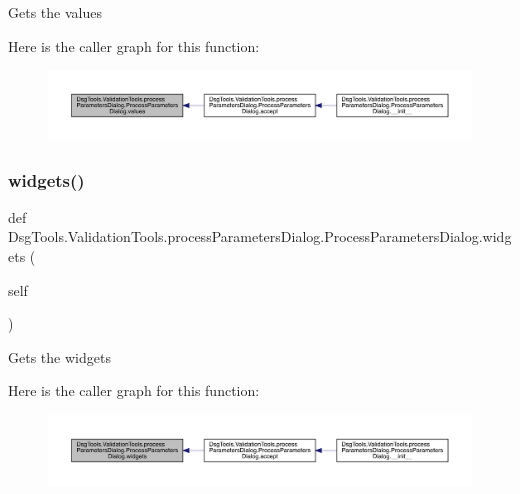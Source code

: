\begin{DoxyVerb}Gets the values
\end{DoxyVerb}
 Here is the caller graph for this function\+:
\nopagebreak
\begin{figure}[H]
\begin{center}
\leavevmode
\includegraphics[width=350pt]{class_dsg_tools_1_1_validation_tools_1_1process_parameters_dialog_1_1_process_parameters_dialog_ac16e1fb8ce02551da4ccb5bcc632f63b_icgraph}
\end{center}
\end{figure}
\mbox{\label{class_dsg_tools_1_1_validation_tools_1_1process_parameters_dialog_1_1_process_parameters_dialog_a6c52b36fdddcbcc1d35597bd5bfc0ff3}} 
\subsubsection{\texorpdfstring{widgets()}{widgets()}}
{\footnotesize\ttfamily def Dsg\+Tools.\+Validation\+Tools.\+process\+Parameters\+Dialog.\+Process\+Parameters\+Dialog.\+widgets (\begin{DoxyParamCaption}\item[{}]{self }\end{DoxyParamCaption})}

\begin{DoxyVerb}Gets the widgets
\end{DoxyVerb}
 Here is the caller graph for this function\+:
\nopagebreak
\begin{figure}[H]
\begin{center}
\leavevmode
\includegraphics[width=350pt]{class_dsg_tools_1_1_validation_tools_1_1process_parameters_dialog_1_1_process_parameters_dialog_a6c52b36fdddcbcc1d35597bd5bfc0ff3_icgraph}
\end{center}
\end{figure}


